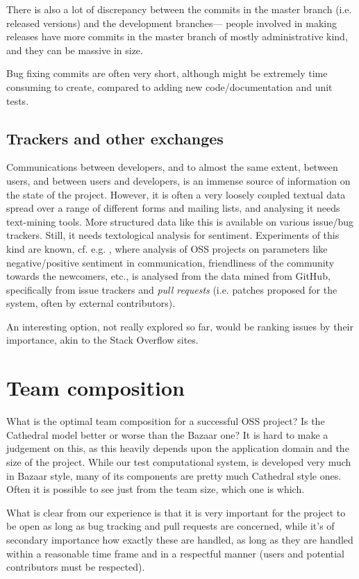 \documentclass{deliverablereport}
\begin{document}
There is also a lot of discrepancy between the commits in the
master branch (i.e. released versions) and the development branches---
people involved in making releases have more commits in the master
branch of mostly administrative kind, and they can be massive in size.

Bug fixing commits are often very short, although might be extremely
time consuming to create, compared to adding new code/documentation
and unit tests.


\subsection{Trackers and other exchanges}\label{wp7:sect:sentana}
Communications between developers, and to almost the same extent,
between users, and between users and developers, is an immense
source of information on the state of the project.
However, it is often a very loosely coupled textual data spread
over a range of different forms and mailing lists, and analysing it
needs text-mining tools. More structured data like this is available
on various issue/bug trackers. Still, it needs textological analysis for
sentiment. Experiments of this kind are known, cf. e.g.
\cite{wp7:fossheartbeat}, where analysis of OSS projects on parameters
like negative/positive sentiment in communication, friendliness of the
community towards the newcomers, etc., is analysed from the data
mined from GitHub, specifically from issue trackers and 
{\em pull requests} (i.e. patches proposed for the system, often by
external contributors).

An interesting option, not really explored so far, would be 
ranking issues by their importance, akin to the Stack Overflow
\cite{wp7:stackoverflow} sites.

\section{Team composition}
What is the optimal team composition for a successful OSS project?
Is the Cathedral model \cite{raymond99:cathedral-bazaar}
better or worse than the Bazaar one? It is hard to make a judgement on this,
as this heavily depends upon the application domain and the
size of the project. While our test computational system, \Sage
is developed very much in Bazaar style, many of its components
are pretty much Cathedral style ones.
Often it is possible to see just from the team size, which one is which.

What is clear from our experience is that it is very important
for the project to be open as long as bug tracking and pull requests
are concerned, while it's of secondary importance how exactly these are handled,
as long as they are handled within a reasonable time frame and in 
a respectful manner (users and potential contributors must be
respected).
\end{document}

